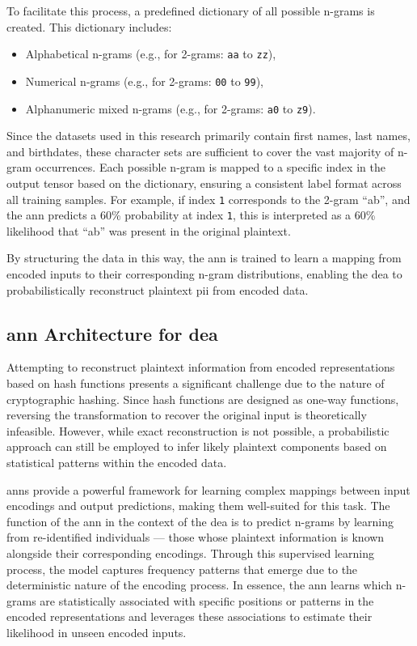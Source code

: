 To facilitate this process, a predefined dictionary of all possible n-grams is created. This dictionary includes:
\begin{itemize}
   \item Alphabetical n-grams (e.g., for 2-grams: \texttt{aa} to \texttt{zz}),
   \item Numerical n-grams (e.g., for 2-grams: \texttt{00} to \texttt{99}),
   \item Alphanumeric mixed n-grams (e.g., for 2-grams: \texttt{a0} to \texttt{z9}).
\end{itemize}

Since the datasets used in this research primarily contain first names, last names, and birthdates, these character sets are sufficient to cover the vast majority of n-gram occurrences.
Each possible n-gram is mapped to a specific index in the output tensor based on the dictionary, ensuring a consistent label format across all training samples.
For example, if index \texttt{1} corresponds to the 2-gram \enquote{ab}, and the \ac{ann} predicts a 60\% probability at index \texttt{1}, this is interpreted as a 60\% likelihood that \enquote{ab} was present in the original plaintext.

By structuring the data in this way, the \ac{ann} is trained to learn a mapping from encoded inputs to their corresponding n-gram distributions, enabling the \ac{dea} to probabilistically reconstruct plaintext \ac{pii} from encoded data.


\subsection{\ac{ann} Architecture for \ac{dea}} \label{sec:architecture}

Attempting to reconstruct plaintext information from encoded representations based on hash functions presents a significant challenge due to the nature of cryptographic hashing.
Since hash functions are designed as one-way functions, reversing the transformation to recover the original input is theoretically infeasible.
However, while exact reconstruction is not possible, a probabilistic approach can still be employed to infer likely plaintext components based on statistical patterns within the encoded data.

\ac{ann}s provide a powerful framework for learning complex mappings between input encodings and output predictions, making them well-suited for this task.
The function of the \ac{ann} in the context of the \ac{dea} is to predict n-grams by learning from re-identified individuals — those whose plaintext information is known alongside their corresponding encodings.
Through this supervised learning process, the model captures frequency patterns that emerge due to the deterministic nature of the encoding process.
In essence, the \ac{ann} learns which n-grams are statistically associated with specific positions or patterns in the encoded representations and leverages these associations to estimate their likelihood in unseen encoded inputs.

